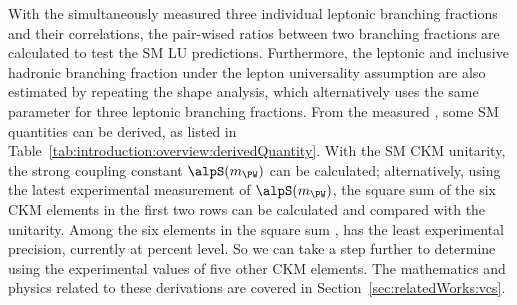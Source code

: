 With the simultaneously measured three individual leptonic branching fractions and their correlations, the pair-wised ratios between two branching fractions are calculated to test the SM LU predictions. Furthermore, the leptonic and inclusive hadronic branching fraction under the lepton universality assumption are also estimated by repeating the shape analysis, which alternatively uses the same parameter for three leptonic branching fractions. From the measured \BWh, some SM quantities can be derived, as listed in Table~\ref{tab:introduction:overview:derivedQuantity}. With the SM CKM unitarity, the strong coupling constant $\alpS(m_\PW)$ can be calculated; alternatively, using the latest experimental measurement of $\alpS(m_\PW)$, the square sum of the six CKM elements in the first two rows can be calculated and compared with the unitarity. Among the six elements in the square sum \sumCKM, \absVcs has the least experimental precision, currently at percent level. So we can take a step further to determine \absVcs using the experimental values of five other CKM elements. The mathematics and physics related to these derivations are covered in Section~\ref{sec:relatedWorks:vcs}.




\begin{table}[!h]
    \setlength{\tabcolsep}{0.5em}
    \renewcommand{\arraystretch}{1.5}
    \centering
    \caption{Standard model quantities can be derived from the measured \BWh. }
    \label{tab:introduction:overview:derivedQuantity}
\end{table}




